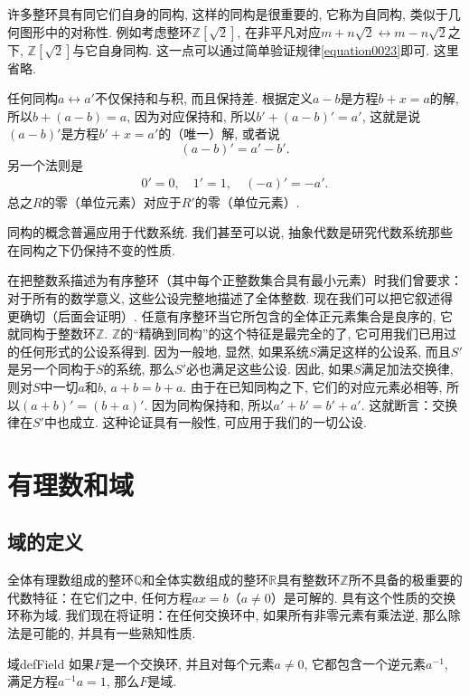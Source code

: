 许多整环具有同它们自身的同构, 这样的同构是很重要的, 它称为自同构, 类似于几何图形中的对称性. 例如考虑整环$\mathbb{Z}[\sqrt{2}]$, 在非平凡对应$m+n\sqrt{2} \leftrightarrow m-n\sqrt{2}$之下, $\mathbb{Z}[\sqrt{2}]$与它自身同构. 这一点可以通过简单验证规律\ref{equation0023}即可. 这里省略. 

任何同构$a \leftrightarrow a'$不仅保持和与积, 而且保持差. 根据定义$a-b$是方程$b+x=a$的解, 所以$b + (a-b) = a$, 因为对应保持和, 所以$b'+(a-b)'=a'$, 这就是说$(a-b)'$是方程$b'+x=a'$的（唯一）解, 或者说
\[
(a-b)' = a'-b'.
\]
另一个法则是
\begin{gather}\label{equation0024}
0'=0,\quad 1'=1, \quad (-a)'=-a'.
\end{gather}
总之$R$的零（单位元素）对应于$R'$的零（单位元素）. 

同构的概念普遍应用于代数系统. 我们甚至可以说, 抽象代数是研究代数系统那些在同构之下仍保持不变的性质. 

在把整数系描述为有序整环（其中每个正整数集合具有最小元素）时我们曾要求：对于所有的数学意义, 这些公设完整地描述了全体整数. 现在我们可以把它叙述得更确切（后面会证明）. 任意有序整环当它所包含的全体正元素集合是良序的, 它就同构于整数环$\mathbb{Z}$. $\mathbb{Z}$的“精确到同构”的这个特征是最完全的了, 它可用我们已用过的任何形式的公设系得到. 因为一般地, 显然, 如果系统$S$满足这样的公设系, 而且$S'$是另一个同构于$S$的系统, 那么$S'$必也满足这些公设. 因此, 如果$S$满足加法交换律, 则对$S$中一切$a$和$b$, $a+b=b+a$. 由于在已知同构之下, 它们的对应元素必相等, 所以$(a+b)'= (b+a)'$. 因为同构保持和, 所以$a'+b'= b'+a'$. 这就断言：交换律在$S'$中也成立. 这种论证具有一般性, 可应用于我们的一切公设. 

\chapter{有理数和域}
\section{域的定义}
全体有理数组成的整环$\mathbb{Q}$和全体实数组成的整环$\mathbb{R}$具有整数环$\mathbb{Z}$所不具备的极重要的代数特征：在它们之中, 任何方程$ax=b$（$a \neq 0$）是可解的. 具有这个性质的交换环称为域. 我们现在将证明：在任何交换环中, 如果所有非零元素有乘法逆, 那么除法是可能的, 并具有一些熟知性质. 
\begin{definition}{域}{defField}
如果$F$是一个交换环, 并且对每个元素$a \neq 0$, 它都包含一个逆元素$a^{-1}$, 满足方程$a^{-1}a=1$, 那么$F$是域. 
\end{definition}

